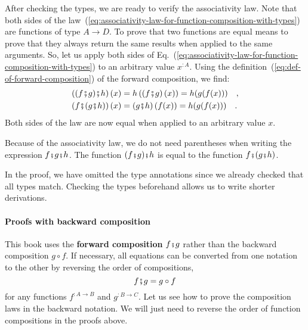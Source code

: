 After checking the types, we are ready to verify the associativity
law. Note that both sides of the law~(\ref{eq:associativity-law-for-function-composition-with-types})
are functions of type $A\rightarrow D$. To prove that two functions
are equal means to prove that they always return the same results
when applied to the same arguments. So, let us apply both sides of
Eq.~(\ref{eq:associativity-law-for-function-composition-with-types})
to an arbitrary value $x^{:A}$. Using the definition~(\ref{eq:def-of-forward-composition})
of the forward composition, we find:
\begin{align*}
\left((f\bef g)\bef h\right)(x) & =h\left(\left(f\bef g\right)(x)\right)=h(g(f(x)))\quad,\\
\left(f\bef(g\bef h)\right)(x) & =\left(g\bef h\right)(f(x))=h(g(f(x)))\quad.
\end{align*}
Both sides of the law are now equal when applied to an arbitrary value
$x$.

Because of the associativity law, we do not need parentheses when
writing the expression $f\bef g\bef h$. The function $(f\bef g)\bef h$
is equal to the function $f\bef(g\bef h)$.

In the proof, we have omitted the type annotations since we already
checked that all types match. Checking the types beforehand allows
us to write shorter derivations.

\paragraph{Proofs with backward composition}

This book uses the \textbf{forward composition}
$f\bef g$ rather than the backward composition
$g\circ f$. If necessary, all equations can be converted from one
notation to the other by reversing the order of compositions,
\[
f\bef g=g\circ f
\]
for any functions $f^{:A\rightarrow B}$ and $g^{:B\rightarrow C}$.
Let us see how to prove the composition laws in the backward notation.
We will just need to reverse the order of function compositions in
the proofs above.

